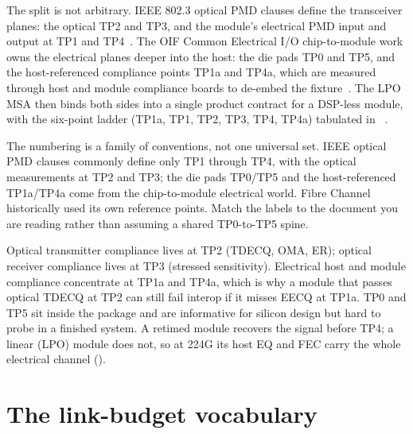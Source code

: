  The split is not arbitrary. IEEE 802.3 optical PMD
clauses define the transceiver planes: the optical TP2 and TP3, and the module's
electrical PMD input and output at TP1 and TP4~\cite{ieee8023dj}. The OIF Common
Electrical I/O chip-to-module work owns the electrical planes deeper into the host:
the die pads TP0 and TP5, and the host-referenced compliance points TP1a and TP4a,
which are measured through host and module compliance boards to de-embed the
fixture~\cite{cei224}. The LPO MSA then binds both sides into a single product
contract for a DSP-less module, with the six-point ladder (TP1a, TP1, TP2, TP3, TP4,
TP4a) tabulated in ~\cite{lpomsa}.

The numbering is a family of conventions, not one universal set. IEEE optical PMD
clauses commonly define only TP1 through TP4, with the optical measurements at TP2
and TP3; the die pads TP0/TP5 and the host-referenced TP1a/TP4a come from the
chip-to-module electrical world. Fibre Channel historically used its own reference
points. Match the labels to the document you are reading rather than assuming a shared
TP0-to-TP5 spine.

 Optical transmitter compliance
lives at TP2 (TDECQ, OMA, ER); optical receiver compliance lives at TP3 (stressed
sensitivity). Electrical host and module compliance concentrate at TP1a and TP4a,
which is why a module that passes optical TDECQ at TP2 can still fail interop if it
misses EECQ at TP1a. TP0 and TP5 sit inside the package and are informative for
silicon design but hard to probe in a finished system. A retimed module recovers the
signal before TP4; a linear (LPO) module does not, so at 224G its host EQ and FEC
carry the whole electrical channel ().


\section{The link-budget vocabulary}

